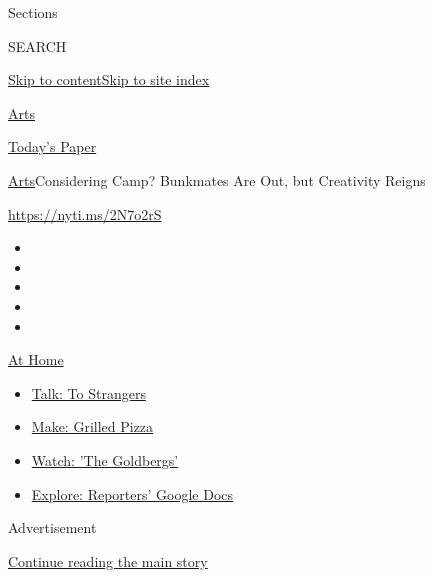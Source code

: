 Sections

SEARCH

\protect\hyperlink{site-content}{Skip to
content}\protect\hyperlink{site-index}{Skip to site index}

\href{https://www.nytimes.com/section/arts}{Arts}

\href{https://myaccount.nytimes.com/auth/login?response_type=cookie\&client_id=vi}{}

\href{https://www.nytimes.com/section/todayspaper}{Today's Paper}

\href{/section/arts}{Arts}\textbar{}Considering Camp? Bunkmates Are Out,
but Creativity Reigns

\url{https://nyti.ms/2N7o2rS}

\begin{itemize}
\item
\item
\item
\item
\item
\end{itemize}

\href{https://www.nytimes.com/spotlight/at-home?action=click\&pgtype=Article\&state=default\&region=TOP_BANNER\&context=at_home_menu}{At
Home}

\begin{itemize}
\tightlist
\item
  \href{https://www.nytimes.com/2020/08/03/well/family/the-benefits-of-talking-to-strangers.html?action=click\&pgtype=Article\&state=default\&region=TOP_BANNER\&context=at_home_menu}{Talk:
  To Strangers}
\item
  \href{https://www.nytimes.com/2020/08/01/at-home/coronavirus-make-pizza-on-a-grill.html?action=click\&pgtype=Article\&state=default\&region=TOP_BANNER\&context=at_home_menu}{Make:
  Grilled Pizza}
\item
  \href{https://www.nytimes.com/2020/07/31/arts/television/goldbergs-abc-stream.html?action=click\&pgtype=Article\&state=default\&region=TOP_BANNER\&context=at_home_menu}{Watch:
  'The Goldbergs'}
\item
  \href{https://www.nytimes.com/interactive/2020/at-home/even-more-reporters-editors-diaries-lists-recommendations.html?action=click\&pgtype=Article\&state=default\&region=TOP_BANNER\&context=at_home_menu}{Explore:
  Reporters' Google Docs}
\end{itemize}

Advertisement

\protect\hyperlink{after-top}{Continue reading the main story}

